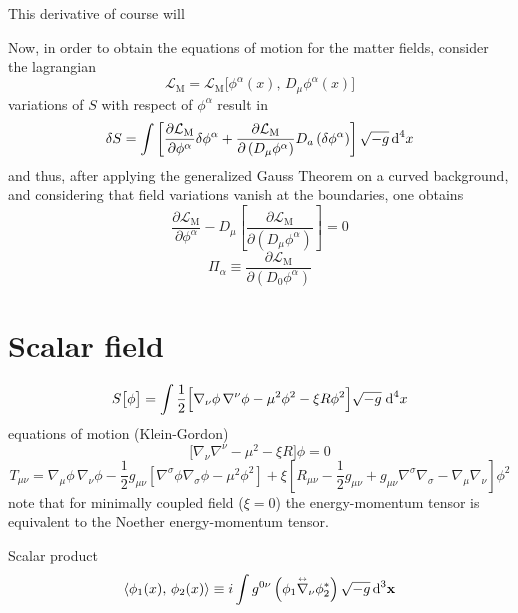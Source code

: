 This derivative of course will 


Now, in order to obtain the equations of motion for the matter fields, consider the lagrangian
\begin{equation}
	\mathcal{L}_{\text{M}}=\mathcal{L}_{\text{M}}\big[\phi^\alpha(x),\,D_\mu\phi^\alpha(x)\big]
\end{equation}
variations of $S$ with respect of $\phi^\alpha$ result in
\begin{equation}
	\delta S=\int\left[\frac{\partial \mathcal{L}_\text{M}}{\partial \phi^\alpha}\delta\phi^\alpha+\frac{\partial \mathcal{L}_\text{M}}{\partial\left(D_\mu\phi^\alpha\right)}D_a\left(\delta\phi^\alpha\right)\right]\sqrt{-g}\,\text{d}^4x
\end{equation}
and thus, after applying the generalized Gauss Theorem on a curved background, and considering that field variations vanish at the boundaries, one obtains
\begin{equation}
	\frac{\partial \mathcal{L}_\text{M}}{\partial \phi^\alpha}-D_\mu\left[\frac{\partial \mathcal{L}_\text{M}}{\partial\left(D_\mu\phi^\alpha\right)}\right]=0
\end{equation}
\begin{equation}
	\Pi_\alpha\equiv \frac{\partial\mathcal{L}_\text{M}}{\partial\left(D_0\phi^\alpha\right)}
\end{equation}
\section{Scalar field}
\begin{equation}
	S\big[\phi\big]=\int\frac{1}{2}\Big[\nabla_\nu\phi\,\nabla^\nu\phi-\mu^2\phi^2-\xi R\phi^2\Big]\sqrt{-g}\;\text{d}^4 x
\end{equation}
equations of motion (Klein-Gordon)
\begin{equation}
	\big[\nabla_\nu\nabla^\nu-\mu^2-\xi R\big]\phi=0
\end{equation}
\begin{equation}
	T_{\mu\nu}=\nabla_\mu\phi\,\nabla_\nu\phi -\frac{1}{2}g_{\mu\nu}\left[\nabla^\sigma\phi\nabla_\sigma\phi-\mu^2\phi^2\right]+\xi\left[R_{\mu\nu}-\frac{1}{2}g_{\mu\nu}+g_{\mu\nu}\nabla^\sigma\nabla_\sigma-\nabla_\mu\nabla_\nu\right]\phi^2
\end{equation}
note that for minimally coupled field ($\xi=0$) the energy-momentum tensor is equivalent to the Noether energy-momentum tensor.

Scalar product
\begin{equation}
	\langle \phi_1(x),\,\phi_2(x)\rangle\equiv i\int g^{0\nu}\left(\phi_1\overset{\text{\tiny$\leftrightarrow$}}{\nabla}_\nu\phi_2^*\right)\sqrt{-g}\,\text{d}^3\mathbf{x}
\end{equation}


